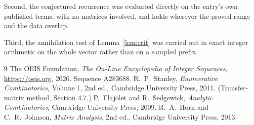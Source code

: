 \documentclass[11pt,a4paper]{article}
\theoremstyle{plain}
\theoremstyle{definition}
\begin{document}
Second, the conjectured recurrence was evaluated directly on the entry's own published terms,
with no matrices involved, and holds wherever the proved range and the data overlap.

Third, the annihilation test of Lemma~\ref{lem:crit} was carried out in exact integer
arithmetic on the whole vector rather than on a sampled prefix.

\begin{thebibliography}{9}
 The OEIS Foundation, \emph{The On-Line Encyclopedia of Integer
Sequences}, \url{https://oeis.org}, 2026. Sequence A283688.
 R.~P.~Stanley, \emph{Enumerative Combinatorics}, Volume 1, 2nd ed.,
Cambridge University Press, 2011. (Transfer-matrix method, Section 4.7.)
 P.~Flajolet and R.~Sedgewick, \emph{Analytic Combinatorics}, Cambridge
University Press, 2009.
 R.~A.~Horn and C.~R.~Johnson, \emph{Matrix Analysis}, 2nd ed., Cambridge
University Press, 2013.
\end{thebibliography}
\end{document}
